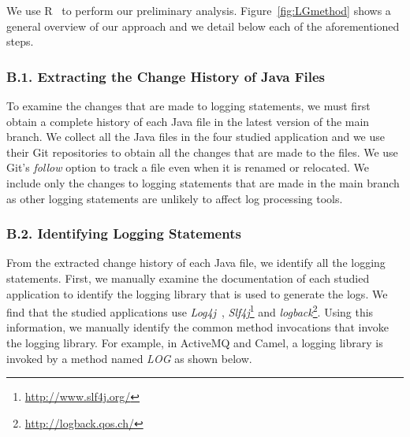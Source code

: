 We use R~\cite{ihaka1996r} to perform our preliminary analysis. Figure~\ref{fig:LGmethod} shows a general overview of our approach and we detail below each of the aforementioned steps. 

\subsubsection*{B.1. Extracting the Change History of Java Files} 
To examine the changes that are made to logging statements, we must first obtain a complete history of each Java file in the latest version of the main branch.
We collect all the Java files in the four studied application and we use their Git repositories to obtain all the changes that are made to the files. We use Git's \emph{follow} option to track a file even when it is renamed or relocated. We include only the changes to logging statements that are made in the main branch as other logging statements are unlikely to affect log processing tools. %


\subsubsection*{B.2. Identifying Logging Statements}
From the extracted change history of each Java file, we identify all the logging statements.
First, we manually examine the documentation of each studied application to identify the logging library that is used to generate the logs. %
We find that the studied applications use \textsl{Log4j}~\cite{EMSEIAN}, \emph{Slf4j}\footnote{\url{http://www.slf4j.org/}} and \emph{logback}\footnote{\url{http://logback.qos.ch/}}.
Using this information, we manually identify the common method invocations that invoke the logging library. For example, in ActiveMQ and Camel, a logging library is invoked by a method named \emph{LOG} as shown below.


